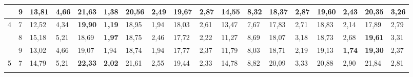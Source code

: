 \documentclass[conference]{IEEEtran}
\begin{document}
\begin{table}[]
\begin{tabular}{|cl|ll|ll|ll|ll|ll|ll|ll|ll|}
		\multicolumn{1}{|c|}{}                    & 9          & \multicolumn{1}{l|}{13,81}         & 4,66          & \multicolumn{1}{l|}{\textbf{21,63}} & \textbf{1,38} & \multicolumn{1}{l|}{20,56}          & 2,49          & \multicolumn{1}{l|}{19,67}         & 2,87          & \multicolumn{1}{l|}{14,55}                & 8,32 & \multicolumn{1}{l|}{18,37}          & 2,87 & \multicolumn{1}{l|}{19,60}          & 2,43          & \multicolumn{1}{l|}{20,35}          & 3,26 \\ \hline
		\multicolumn{1}{|c|}{\multirow{3}{*}{4}}  & 7          & \multicolumn{1}{l|}{12,52}         & 4,34          & \multicolumn{1}{l|}{\textbf{19,90}} & \textbf{1,19} & \multicolumn{1}{l|}{18,95}          & 1,94          & \multicolumn{1}{l|}{18,03}         & 2,61          & \multicolumn{1}{l|}{13,47}                & 7,67 & \multicolumn{1}{l|}{17,83}          & 2,71 & \multicolumn{1}{l|}{18,83}          & 2,14          & \multicolumn{1}{l|}{17,89}          & 2,79 \\ \cline{2-18} 
		\multicolumn{1}{|c|}{}                    & 8          & \multicolumn{1}{l|}{15,18}         & 5,21          & \multicolumn{1}{l|}{18,69}          & \textbf{1,97} & \multicolumn{1}{l|}{18,75}          & 2,46          & \multicolumn{1}{l|}{17,72}         & 2,22          & \multicolumn{1}{l|}{11,27}                & 8,69 & \multicolumn{1}{l|}{18,07}          & 3,18 & \multicolumn{1}{l|}{18,73}          & 2,68          & \multicolumn{1}{l|}{\textbf{19,61}} & 3,31 \\ \cline{2-18} 
		\multicolumn{1}{|c|}{}                    & 9          & \multicolumn{1}{l|}{13,02}         & 4,66          & \multicolumn{1}{l|}{19,07}          & 1,94          & \multicolumn{1}{l|}{18,74}          & 1,94          & \multicolumn{1}{l|}{17,77}         & 2,37          & \multicolumn{1}{l|}{11,79}                & 8,03 & \multicolumn{1}{l|}{18,71}          & 2,19 & \multicolumn{1}{l|}{19,13}          & \textbf{1,74} & \multicolumn{1}{l|}{\textbf{19,30}} & 2,37 \\ \hline
		\multicolumn{1}{|c|}{\multirow{3}{*}{5}}  & 7          & \multicolumn{1}{l|}{14,79}         & 5,21          & \multicolumn{1}{l|}{\textbf{22,33}} & \textbf{2,02} & \multicolumn{1}{l|}{21,61}          & 2,55          & \multicolumn{1}{l|}{19,44}         & 2,33          & \multicolumn{1}{l|}{14,78}                & 8,82 & \multicolumn{1}{l|}{20,09}          & 3,33 & \multicolumn{1}{l|}{20,88}          & 2,90          & \multicolumn{1}{l|}{21,84}          & 2,81 \\ \cline{2-18} 

\end{tabular}
\end{table}
\end{document}
